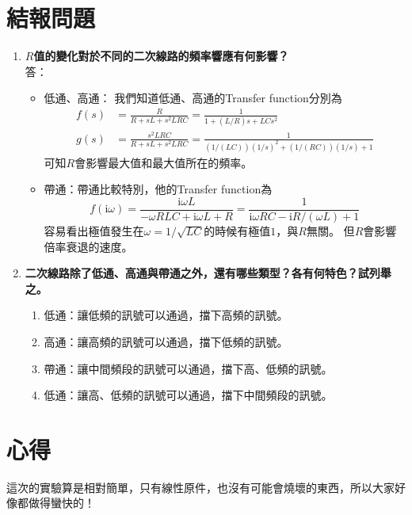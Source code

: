 \documentclass[12pt, a4paper]{article}
\def\large{\fontsize{14}{21}\selectfont}
\newcommand{\img}{\mathrm{i}}
\begin{document}
\section{結報問題}

\begin{enumerate}[itemsep=20pt, topsep=10pt]
  \item {\large\bf $R$值的變化對於不同的二次線路的頻率響應有何影響？} \\[10pt]
    答：\\
    \begin{itemize}
      \item 低通、高通：
        我們知道低通、高通的Transfer function分別為
        \begin{align*}
          f(s) &= \frac{R}{R + sL + s^2 LRC} =\frac{1}{1 + (L/R)s + LCs^2} \\
          g(s) &= \frac{s^2 LRC}{R + sL + s^2 LRC} = \frac{1}{(1/(LC))(1/s)^2 + (1/(RC))(1/s) + 1} 
        \end{align*}
      可知$R$會影響最大值和最大值所在的頻率。
    \item 帶通：帶通比較特別，他的Transfer function為
      \[
        f(\img \omega) = \frac{\img \omega L}{-\omega RLC + \img \omega L + R} = \frac{1}{\img \omega R C - \img R / (\omega L) + 1} 
      \]
      容易看出極值發生在$\omega = 1/\sqrt{LC}$的時候有極值$1$，與$R$無關。
但$R$會影響倍率衰退的速度。
    \end{itemize}

\item {\large\bf 二次線路除了低通、高通與帶通之外，還有哪些類型？各有何特色？試列舉之。} \\[10pt]
  \begin{enumerate}[label=\arabic*.]
    \item 低通：讓低頻的訊號可以通過，擋下高頻的訊號。
    \item 高通：讓高頻的訊號可以通過，擋下低頻的訊號。
    \item 帶通：讓中間頻段的訊號可以通過，擋下高、低頻的訊號。
    \item 低通：讓高、低頻的訊號可以通過，擋下中間頻段的訊號。
  \end{enumerate}

\end{enumerate}

\section{心得}
這次的實驗算是相對簡單，只有線性原件，也沒有可能會燒壞的東西，所以大家好像都做得蠻快的！
\end{document}
